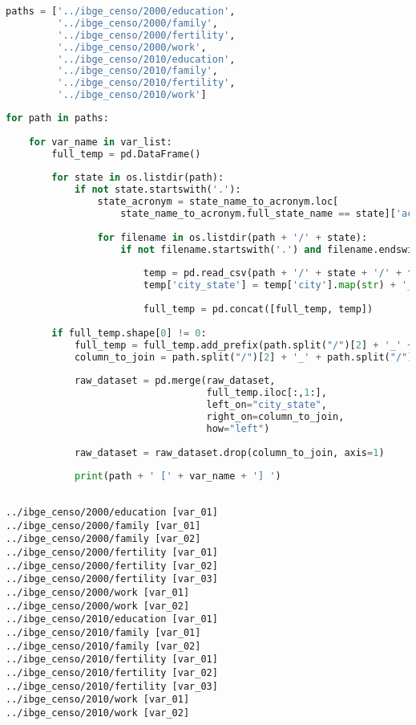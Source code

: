 \begin{lstlisting}[language=Python]
paths = ['../ibge_censo/2000/education',
         '../ibge_censo/2000/family',
         '../ibge_censo/2000/fertility',
         '../ibge_censo/2000/work',
         '../ibge_censo/2010/education',
         '../ibge_censo/2010/family',
         '../ibge_censo/2010/fertility',
         '../ibge_censo/2010/work']
\end{lstlisting}

\begin{lstlisting}[language=Python]
for path in paths:
    
    for var_name in var_list:
        full_temp = pd.DataFrame()
        
        for state in os.listdir(path):
            if not state.startswith('.'):
                state_acronym = state_name_to_acronym.loc[
                    state_name_to_acronym.full_state_name == state]['acronym'].values[0]
        
                for filename in os.listdir(path + '/' + state):
                    if not filename.startswith('.') and filename.endswith(var_name + '.csv'):
        
                        temp = pd.read_csv(path + '/' + state + '/' + filename)
                        temp['city_state'] = temp['city'].map(str) + '_' + state_acronym
                        
                        full_temp = pd.concat([full_temp, temp])
        
        if full_temp.shape[0] != 0:
            full_temp = full_temp.add_prefix(path.split("/")[2] + '_' + path.split("/")[3] + '_' + var_name + '_')
            column_to_join = path.split("/")[2] + '_' + path.split("/")[3] + '_' + var_name + '_city_state'
            
            raw_dataset = pd.merge(raw_dataset,
                                   full_temp.iloc[:,1:],
                                   left_on="city_state",
                                   right_on=column_to_join,
                                   how="left")
            
            raw_dataset = raw_dataset.drop(column_to_join, axis=1)
            
            print(path + ' [' + var_name + '] ')
        
\end{lstlisting}

\begin{lstlisting}
../ibge_censo/2000/education [var_01] 
../ibge_censo/2000/family [var_01] 
../ibge_censo/2000/family [var_02] 
../ibge_censo/2000/fertility [var_01] 
../ibge_censo/2000/fertility [var_02] 
../ibge_censo/2000/fertility [var_03] 
../ibge_censo/2000/work [var_01] 
../ibge_censo/2000/work [var_02] 
../ibge_censo/2010/education [var_01] 
../ibge_censo/2010/family [var_01] 
../ibge_censo/2010/family [var_02] 
../ibge_censo/2010/fertility [var_01] 
../ibge_censo/2010/fertility [var_02] 
../ibge_censo/2010/fertility [var_03] 
../ibge_censo/2010/work [var_01] 
../ibge_censo/2010/work [var_02] 
\end{lstlisting}

